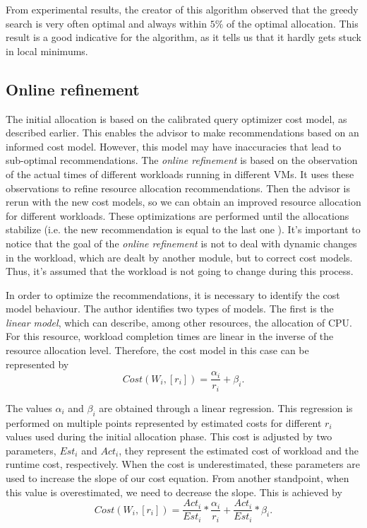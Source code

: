 From experimental results, the creator of this algorithm observed that the greedy search is very often optimal and always within $5\%$ of the optimal allocation. This result is a good indicative for the algorithm, as it tells us that it hardly gets stuck in local minimums.



\subsection{Online refinement}

The initial allocation is based on the calibrated query optimizer cost model, as described earlier. This enables the advisor to make recommendations based on an informed cost model. However, this model may have inaccuracies that lead to sub-optimal recommendations. The  \textit{online refinement} is based on the observation of the actual times of different workloads running in different VMs. It uses these observations to refine resource allocation recommendations. Then the advisor is rerun with the new cost models, so  we can obtain an improved resource allocation for different workloads. These optimizations are performed until the allocations stabilize (i.e. the new recommendation is equal to the last one ). It's important to notice that the goal of the \textit{online refinement} is not to deal with dynamic changes in the workload, which are dealt by another module, but to correct cost models. Thus, it's assumed that the workload is not going to change during this process. 

In order to optimize the recommendations, it is necessary to identify the cost model behaviour. The author identifies two types of models. The first is the \textit{linear model}, which can describe, among other resources, the allocation of CPU. For this resource, workload completion times are linear in the inverse of the resource allocation level. Therefore, the cost model in this case can be represented by
\[
 Cost(W_{i}, [r_{i}]) = \frac{\alpha_{i}}{r_{i}} +\beta_{i}.
\]

The values $\alpha_{i}$ and $\beta_{i}$ are obtained through a linear regression. This regression is performed on multiple points represented by estimated costs for different $r_{i}$ values used during the initial allocation phase. This cost is adjusted by two parameters, $Est_{i}$ and $Act_{i}$, they represent the estimated cost of workload and the runtime cost, respectively. When the cost is underestimated, these parameters are used to increase the slope of our cost equation. From another standpoint, when this value is overestimated, we need to decrease the slope. This is achieved by
\[
  Cost(W_{i}, [r_{i}]) = \frac{Act_{i}}{Est_{i}} * \frac{\alpha_{i}}{r_{i}} + \frac{Act_{i}}{Est_{i}} * \beta_{i}.
\]

